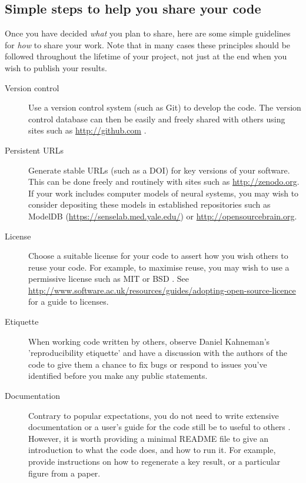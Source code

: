 \documentclass[11pt]{article}
\begin{document}
\subsection*{Simple steps to help you share your code}

Once you have decided \textit{what} you plan to share, here are some simple
guidelines for \textit{how} to share your work.  Note that in many cases these
principles should be followed throughout the lifetime of your project,
not just at the end when you wish to publish your results.

\begin{description}
\item [Version control] Use a version control system (such as Git) to
  develop the code.  The version control database can then be easily and freely
  shared with others using sites such as \url{http://github.com} \cite{Ram2013}.

\item [Persistent URLs] Generate stable URLs (such as a DOI) for key
  versions of your software.  This can be done freely and routinely with sites
  such as \url{http://zenodo.org}.  If your work includes computer
  models of neural systems, you may wish to consider depositing these
  models in established repositories such as ModelDB
  (\url{https://senselab.med.yale.edu/}) or
  \url{http://opensourcebrain.org}.

\item [License] Choose a suitable license for your code to assert how you wish others to reuse your code.  For example, to maximise reuse, you may wish to use a permissive license such as MIT or BSD \cite{Stodden2009}.  See  \url{http://www.software.ac.uk/resources/guides/adopting-open-source-licence}  for a guide to licenses.

\item [Etiquette] When working code written by others, observe Daniel Kahneman's \cite{Kahneman2014} 'reproducibility etiquette' and have a discussion with the authors of the code to give them a chance to fix bugs or respond to issues you've identified before you make any public statements.

\item [Documentation] Contrary to popular expectations, you do not
  need to write extensive documentation or a user's guide for the code
  still be to useful to others \cite{Barnes2010-iv}.  However, it is
  worth providing a minimal README file to give an introduction to
  what the code does, and how to run it.  For example, provide
  instructions on how to regenerate a key result, or a particular
  figure from a paper.


\end{description}
\end{document}

